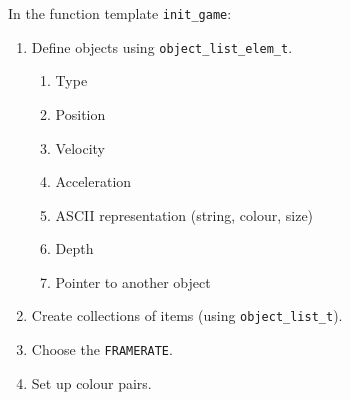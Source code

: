 \documentclass{beamer}
\begin{document}
\begin{frame}
\begin{columns}
\begin{column}{0.625\textwidth}
			In the function template \texttt{init\_game}:
			\begin{enumerate}
				\item Define objects using \texttt{object\_list\_elem\_t}.
				\begin{enumerate}
					\item Type
					\item Position
					\item Velocity
					\item Acceleration
					\item ASCII representation (string, colour, size)
					\item Depth
					\item Pointer to another object
				\end{enumerate}
				\item Create collections of items (using \texttt{object\_list\_t}).
				\item Choose the \texttt{FRAMERATE}.
				\item Set up colour pairs.
			\end{enumerate}
		\end{column}
		\begin{column}{0.375\textwidth}
			\begin{figure}

\end{figure}
\end{column}
\end{columns}
\end{frame}
\end{document}
